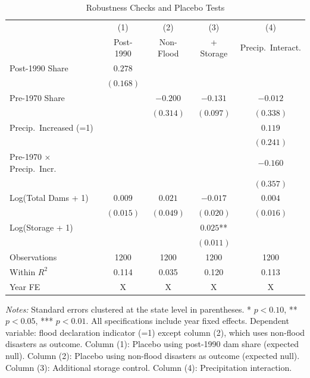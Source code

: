 \begin{table}[htbp]
\centering
\caption{Robustness Checks and Placebo Tests}
\label{tab:robustness}
\begin{threeparttable}
\begin{tabular}{lcccc}
\toprule
 & (1) & (2) & (3) & (4) \\
 & Post-1990 & Non-Flood & + Storage & Precip.\ Interact. \\
\midrule
Post-1990 Share            & $0.278$    &            &            &            \\
                           & $(0.168)$  &            &            &            \\[4pt]
Pre-1970 Share             &            & $-0.200$   & $-0.131$   & $-0.012$   \\
                           &            & $(0.314)$  & $(0.097)$  & $(0.338)$  \\[4pt]
Precip.\ Increased (=1)    &            &            &            & $0.119$    \\
                           &            &            &            & $(0.241)$  \\[4pt]
Pre-1970 $\times$ Precip.\ Incr. &       &            &            & $-0.160$   \\
                           &            &            &            & $(0.357)$  \\[4pt]
Log(Total Dams + 1)        & $0.009$    & $0.021$    & $-0.017$   & $0.004$    \\
                           & $(0.015)$  & $(0.049)$  & $(0.020)$  & $(0.016)$  \\[4pt]
Log(Storage + 1)           &            &            & $0.025$**  &            \\
                           &            &            & $(0.011)$  &            \\
\midrule
Observations               & 1200       & 1200       & 1200       & 1200       \\
Within $R^2$               & 0.114      & 0.035      & 0.120      & 0.113      \\
Year FE                    & X          & X          & X          & X          \\
\bottomrule
\end{tabular}
\begin{tablenotes}[flushleft]
\small
\item \textit{Notes:} Standard errors clustered at the state level in parentheses. * $p<0.10$, ** $p<0.05$, *** $p<0.01$. All specifications include year fixed effects. Dependent variable: flood declaration indicator (=1) except column (2), which uses non-flood disasters as outcome. Column (1): Placebo using post-1990 dam share (expected null). Column (2): Placebo using non-flood disasters as outcome (expected null). Column (3): Additional storage control. Column (4): Precipitation interaction.
\end{tablenotes}
\end{threeparttable}
\end{table}

